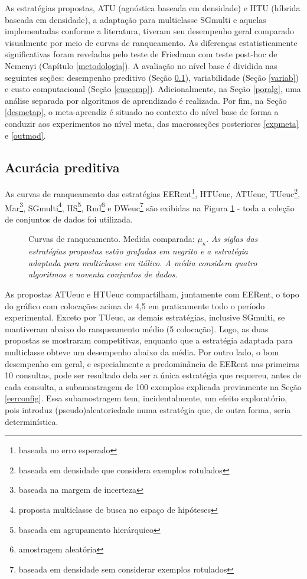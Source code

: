 As estratégias propostas, ATU (agnóstica baseada em densidade) e HTU (híbrida baseada em densidade), a adaptação para multiclasse SGmulti e aquelas implementadas conforme a literatura, tiveram seu desempenho
geral %
comparado visualmente por meio de curvas de ranqueamento.
As diferenças estatisticamente significativas foram reveladas pelo teste de Friedman com teste post-hoc de Nemenyi (Capítulo \ref{metodologia}).
A avaliação no nível base é dividida nas seguintes seções: desempenho preditivo (Seção \ref{despred}), variabilidade (Seção \ref{variab}) e custo computacional (Seção \ref{cuscomp}).
Adicionalmente, na Seção \ref{poralg}, uma análise separada por algoritmos de aprendizado é realizada.
Por fim, na Seção \ref{desmetap}, o meta-aprendiz é situado no contexto do nível base de forma a conduzir aos experimentos no nível meta, das macrosseções posteriores \ref{expmeta} e \ref{outmod}.

\subsection{Acurácia preditiva}\label{despred}
As curvas de ranqueamento das estratégias EERent\footnote{baseada no erro esperado}, HTUeuc, ATUeuc, TUeuc\footnote{baseada em densidade que considera exemplos rotulados}, Mar\footnote{baseada na margem de incerteza}, SGmulti\footnote{proposta multiclasse de busca no espaço de hipóteses}, HS\footnote{baseada em agrupamento hierárquico}, Rnd\footnote{amostragem aleatória} e DWeuc\footnote{baseada em densidade sem considerar exemplos rotulados} são exibidas na Figura \ref{curvasrank} - toda a coleção de conjuntos de dados foi utilizada.
\begin{figure}
	\centering
	
	\caption[Curvas de ranqueamento ($\mu_{\kappa}$).]{Curvas de ranqueamento. Medida comparada: $\mu_{\kappa}$. \textit{As siglas das estratégias propostas estão grafadas em negrito e a estratégia adaptada para multiclasse em itálico. A média considera quatro algoritmos e noventa conjuntos de dados.}}
	\label{curvasrank}
\end{figure}
As propostas ATUeuc e HTUeuc compartilham, juntamente com EERent, o topo do gráfico com colocações acima de 4,5 em praticamente todo o período experimental.
Exceto por TUeuc, as demais estratégias, inclusive SGmulti, se mantiveram abaixo do ranqueamento médio (5\textordfeminine\xspace colocação).
Logo, as duas propostas se mostraram competitivas, enquanto que a estratégia adaptada para multiclasse obteve um desempenho abaixo da média.
Por outro lado, o bom desempenho em geral, e especialmente a predominância de EERent nas primeiras 10 consultas, pode ser resultado dela ser a única estratégia que requereu, antes de cada consulta, a subamostragem de 100 exemplos explicada previamente na Seção \ref{eerconfig}.
Essa subamostragem tem, incidentalmente, um efeito exploratório, pois introduz (pseudo)aleatoriedade numa estratégia que, de outra forma, seria determinística.

